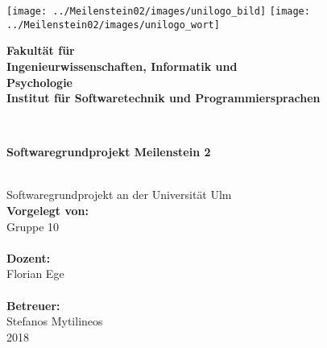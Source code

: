 \documentclass[a4paper,12pt,
headsepline,           %
oneside,               %
pointlessnumbers,      %
bibtotoc,              %
]{scrartcl}
\newcommand{\fullname}{Gruppe 10}
\newcommand{\titel}{Softwaregrundprojekt Meilenstein 2}
\newcommand{\jahr}{2018}
\newcommand{\dozent}{Florian Ege}
\newcommand{\betreuer}{Stefanos Mytilineos}
\newcommand{\fakultaet}{Ingenieurwissenschaften, Informatik und\\Psychologie}
\newcommand{\institut}{Institut für Softwaretechnik und Programmiersprachen}
\begin{document}
    \thispagestyle{empty}
    \begin{addmargin*}[4mm]{-10mm}

        \texttt{[image: ../Meilenstein02/images/unilogo\_bild]}
        \hfill
        \texttt{[image: ../Meilenstein02/images/unilogo\_wort]}\\[1em]

        {\footnotesize
        \hspace*{115mm}\parbox[t]{35mm}{\bfseries Fakultät für\\
        \fakultaet\\
        \mdseries \institut}\\[2cm]

        \parbox{140mm}{\bfseries \LARGE \titel}\\[2.5em]
        {\footnotesize Softwaregrundprojekt an der Universität Ulm}\\[3em]

        {\footnotesize \bfseries Vorgelegt von:}\\
        {\footnotesize \fullname\\}\\ [1em]
        {\footnotesize \bfseries Dozent:}\\
        {\footnotesize \dozent\\}\\[1em]
        {\footnotesize \bfseries Betreuer:}\\
        {\footnotesize \betreuer}\\ [1em]
        {\footnotesize \jahr}
        }
    \end{addmargin*}
    \pagebreak
    \tableofcontents
    \pagebreak

    

    
\end{document}
